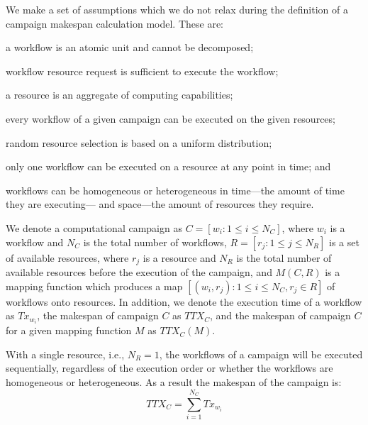 We make a set of assumptions which we do not relax during the definition of a
campaign makespan calculation model. These are:
\begin{inparaenum}[(1)]
    \item a workflow is an atomic unit and cannot be decomposed;
    \item workflow resource request is sufficient to execute the workflow;
    \item a resource is an aggregate of computing capabilities;
    \item every workflow of a given campaign can be executed on the given resources;
    \item random resource selection is based on a uniform distribution;
    \item only one workflow can be executed on a resource at any point in time; and
    \item workflows can be homogeneous or heterogeneous in time---the amount of time they are executing--- and space---the amount of resources they require.
\end{inparaenum}

We denote a computational campaign as $C = [w_{i}: 1 \leq i \leq N_{C}]$,
where $w_{i}$ is a workflow and $N_{C}$ is the total number of workflows,
$R = [ r_{j}: 1 \leq j \leq N_{R}]$ is a set of available resources, where
$r_{j}$ is a resource and $N_{R}$ is the total number of available resources
before the execution of the campaign, and $ M(C,R) $ is a mapping function
which produces a map $ [(w_i, r_j): 1 \leq i \leq N_{C}, r_j \in R] $ of
workflows onto resources. In addition, we denote the execution time of a
workflow as $Tx_{w_{i}}$, the makespan of campaign $C$ as $TTX_{C}$, and the
makespan of campaign $C$ for a given mapping function $ M $ as $TTX_{C}(M)$.

With a single resource, i.e., $N_{R} = 1$, the workflows of a campaign will be
executed sequentially, regardless of the execution order or whether the
workflows are homogeneous or heterogeneous. As a result the makespan of the
campaign is:
\begin{equation}
   TTX_{C} = \sum_{i=1}^{N_{C}}Tx_{w_{i}}
\end{equation}

